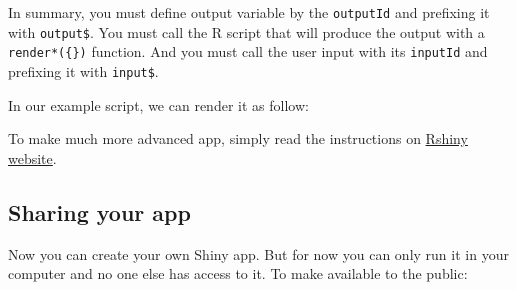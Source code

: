 \documentclass[
]{book}
\newenvironment{Shaded}{\begin{snugshade}}{\end{snugshade}}
\newcommand{\ControlFlowTok}[1]{\textcolor[rgb]{0.13,0.29,0.53}{\textbf{#1}}}
\newcommand{\DataTypeTok}[1]{\textcolor[rgb]{0.13,0.29,0.53}{#1}}
\newcommand{\DecValTok}[1]{\textcolor[rgb]{0.00,0.00,0.81}{#1}}
\newcommand{\KeywordTok}[1]{\textcolor[rgb]{0.13,0.29,0.53}{\textbf{#1}}}
\newcommand{\NormalTok}[1]{#1}
\newcommand{\OperatorTok}[1]{\textcolor[rgb]{0.81,0.36,0.00}{\textbf{#1}}}
\newcommand{\StringTok}[1]{\textcolor[rgb]{0.31,0.60,0.02}{#1}}
\begin{document}
In summary, you must define output variable by the \texttt{outputId} and prefixing it with \texttt{output\$}. You must call the R script that will produce the output with a \texttt{render*(\{\})} function. And you must call the user input with its \texttt{inputId} and prefixing it with \texttt{input\$}.

In our example script, we can render it as follow:

\begin{Shaded}
\end{Shaded}

To make much more advanced app, simply read the instructions on \href{https://shiny.rstudio.com/articles/}{Rshiny website}.

\hypertarget{sharing-your-app}{%
\subsection{Sharing your app}\label{sharing-your-app}}

Now you can create your own Shiny app. But for now you can only run it in your computer and no one else has access to it. To make available to the public:
\end{document}
